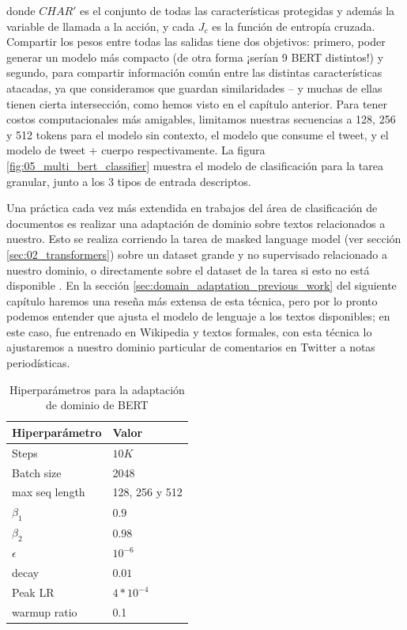 donde $CHAR'$ es el conjunto de todas las características protegidas y además la variable de llamada a la acción, y cada $ J_c $ es la función de entropía cruzada. Compartir los pesos entre todas las salidas tiene dos objetivos: primero, poder generar un modelo más compacto (de otra forma ¡serían 9 BERT distintos!) y segundo, para compartir información común entre las distintas características atacadas, ya que consideramos que guardan similaridades -- y muchas de ellas tienen cierta intersección, como hemos visto en el capítulo anterior. Para tener costos computacionales más amigables, limitamos nuestras secuencias a 128, 256 y 512 tokens para el modelo sin contexto, el modelo que consume el tweet, y el modelo de tweet + cuerpo respectivamente. La figura \ref{fig:05_multi_bert_classifier} muestra el modelo de clasificación para la tarea granular, junto a los 3 tipos de entrada descriptos.

Una práctica cada vez más extendida en trabajos del área de clasificación de documentos es realizar una adaptación de dominio sobre textos relacionados a nuestro. Esto se realiza corriendo la tarea de masked language model (ver sección \ref{sec:02_transformers}) sobre un dataset grande y no supervisado relacionado a nuestro dominio, o directamente sobre el dataset de la tarea si esto no está disponible \cite{gururangan-etal-2020-dont}. En la sección \ref{sec:domain_adaptation_previous_work} del siguiente capítulo haremos una reseña más extensa de esta técnica, pero por lo pronto podemos entender que ajusta el modelo de lenguaje a los textos disponibles; en este caso, \beto{} fue entrenado en Wikipedia y textos formales, con esta técnica lo ajustaremos a nuestro dominio particular de comentarios en Twitter a notas periodísticas.

\begin{table}[t]
    \centering
    \begin{tabular}{ll}
        \toprule
        Hiperparámetro & Valor         \\
        \midrule
        Steps          & $10K$           \\
        Batch size     & 2048            \\
        max seq length & 128, 256 y 512  \\
        $\beta_1$      & $0.9$           \\
        $\beta_2$      & $0.98$          \\
        $\epsilon$     & $10^{-6}$       \\
        decay          & $0.01$          \\
        Peak LR        & $4*10^{-4}$     \\
        warmup ratio   & 0.1             \\
        \bottomrule
    \end{tabular}
    \caption{Hiperparámetros para la adaptación de dominio de BERT}
    \label{tab:hs_ft_hyperparameter}
\end{table}

